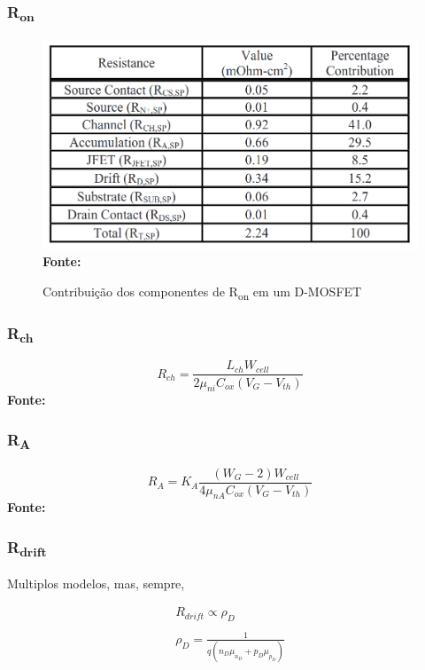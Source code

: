 \begin{frame}
    
    \frametitle{R\textsubscript{on}}

    \begin{figure}[!htbp]
        \centering
        \caption{Contribuição dos componentes de R\textsubscript{on} em um D-MOSFET}
        \includegraphics[scale=0.2]{imagens/rondmos_contribution.png}
        \\\small{\textbf{Fonte:} \cite{baliga2010fundamentals}}%
    \end{figure}

\end{frame}

\begin{frame}
    
    \frametitle{R\textsubscript{ch}}

    \begin{equation}
        R_{ch} = \frac{L_{ch}W_{cell}}{2\mu_{ni}C_{ox}(V_G-V_{th})}
    \end{equation}\small{\textbf{Fonte:} \cite{baliga2010fundamentals}}\\

\end{frame}

\begin{frame}

    \frametitle{R\textsubscript{A}}

    \begin{equation}
        R_{A} = K_A\frac{(W_G-2)W_{cell}}{4\mu_{nA}C_{ox}(V_G-V_{th})}
    \end{equation}\small{\textbf{Fonte:} \cite{baliga2010fundamentals}}\\

\end{frame}

\begin{frame}

    \frametitle{R\textsubscript{drift}}

    Multiplos modelos, mas, sempre,

    \begin{gather}
        R_{drift} \propto \rho_D \\ \ \\
        \rho_D = \frac{1}{q(n_D\mu_{n_D} + p_D\mu_{p_D})}
    \end{gather}

\end{frame}
